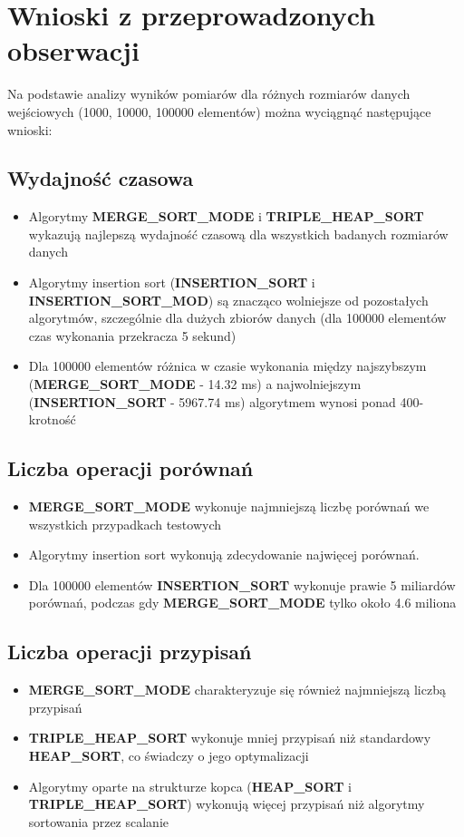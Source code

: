 \documentclass[12pt,a4paper]{article}
\begin{document}
\section{Wnioski z przeprowadzonych obserwacji}

Na podstawie analizy wyników pomiarów dla różnych rozmiarów danych wejściowych (1000, 10000, 100000 elementów) można wyciągnąć następujące wnioski:

\subsection{Wydajność czasowa}
\begin{itemize}
\item Algorytmy \textbf{MERGE\_SORT\_MODE} i \textbf{TRIPLE\_HEAP\_SORT} wykazują najlepszą wydajność czasową dla wszystkich badanych rozmiarów danych
\item Algorytmy insertion sort (\textbf{INSERTION\_SORT} i \textbf{INSERTION\_SORT\_MOD}) są znacząco wolniejsze od pozostałych algorytmów, szczególnie dla dużych zbiorów danych (dla 100000 elementów czas wykonania przekracza 5 sekund)
\item Dla 100000 elementów różnica w czasie wykonania między najszybszym (\textbf{MERGE\_SORT\_MODE} - 14.32 ms) a najwolniejszym (\textbf{INSERTION\_SORT} - 5967.74 ms) algorytmem wynosi ponad 400-krotność
\end{itemize}
\subsection{Liczba operacji porównań}
\begin{itemize}
\item \textbf{MERGE\_SORT\_MODE} wykonuje najmniejszą liczbę porównań we wszystkich przypadkach testowych
\item Algorytmy insertion sort wykonują zdecydowanie najwięcej porównań.
\item Dla 100000 elementów \textbf{INSERTION\_SORT} wykonuje prawie 5 miliardów porównań, podczas gdy \textbf{MERGE\_SORT\_MODE} tylko około 4.6 miliona
\end{itemize}

\subsection{Liczba operacji przypisań}
\begin{itemize}
\item \textbf{MERGE\_SORT\_MODE} charakteryzuje się również najmniejszą liczbą przypisań
\item \textbf{TRIPLE\_HEAP\_SORT} wykonuje mniej przypisań niż standardowy \textbf{HEAP\_SORT}, co świadczy o jego optymalizacji
\item Algorytmy oparte na strukturze kopca (\textbf{HEAP\_SORT} i \textbf{TRIPLE\_HEAP\_SORT}) wykonują więcej przypisań niż algorytmy sortowania przez scalanie
\end{itemize}
\end{document}
